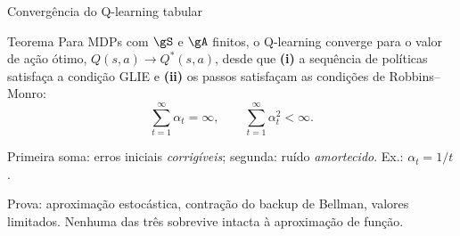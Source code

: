 \documentclass[aspectratio=169, 11pt]{beamer}
\newcommand{\Qstar}{Q^{*}}
\begin{document}
\begin{frame}{Convergência do Q-learning tabular}

  \begin{teobox}{Teorema}
    Para MDPs com $\gS$ e $\gA$ finitos, o Q-learning converge para o valor
    de ação ótimo, $Q(s,a) \to \Qstar(s,a)$, desde que \textbf{(i)} a
    sequência de políticas satisfaça a condição GLIE e \textbf{(ii)} os
    passos satisfaçam as condições de Robbins--Monro:
    \vspace{-0.7em}
    \[ \sum_{t=1}^{\infty} \alpha_t = \infty, \qquad
       \sum_{t=1}^{\infty} \alpha_t^2 < \infty. \]
  \end{teobox}

  \begin{ideiabox}
    Primeira soma: erros iniciais \emph{corrigíveis}; segunda: ruído
    \emph{amortecido}. Ex.: $\alpha_t = 1/t$.
  \end{ideiabox}

  {\small Prova: aproximação estocástica, contração do backup de Bellman,
  valores limitados. \alert{Nenhuma das três sobrevive intacta à
  aproximação de função.}}
\end{frame}
\end{document}
